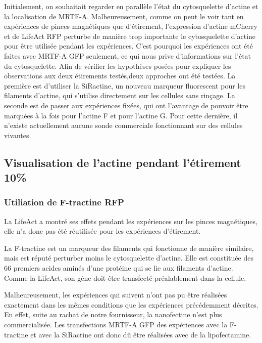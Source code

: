 Initialement, on souhaitait regarder en parallèle l'état du cytosquelette d'actine et la localisation de MRTF-A. 
Malheureusement, comme on peut le voir tant en expériences de pinces magnétiques que d'étirement, l'expression d'actine mCherry et de LifeAct RFP perturbe de manière trop importante le cytosquelette d'actine pour être utilisée pendant les expériences. 
C'est pourquoi les expériences ont été faites avec MRTF-A GFP seulement, ce qui nous prive d'informations sur l'état du cytosquelette.
Afin de vérifier les hypothèses posées pour expliquer les observations aux deux étirements testés,deux approches ont été testées. La première est d'utiliser la SiRactine, un nouveau marqueur fluorescent pour les filaments d'actine, qui s'utilise directement sur les cellules sans rinçage. 
La seconde est de passer aux expériences fixées, qui ont l'avantage de pouvoir être marquées à la fois pour l'actine F et pour l'actine G. Pour cette dernière, il n'existe actuellement aucune sonde commerciale fonctionnant sur des cellules vivantes. 

\subsection{Visualisation de l'actine pendant l'étirement 10\%}

\subsubsection{Utiliation de F-tractine RFP}


La LifeAct a montré ses effets pendant les expériences sur les pinces magnétiques, elle n'a donc pas été réutilisée pour les expériences d'étirement. 

La F-tractine est un marqueur des filaments qui fonctionne de manière similaire, mais est réputé perturber moins le cytosquelette d'actine. Elle est constituée des 66 premiers acides aminés d'une protéine qui se lie aux filaments d'actine. Comme la LifeAct, son gène doit être transfecté préalablement dans la cellule. 

Malheureusement, les expériences qui suivent n'ont pas pu être réalisées exactement dans les mêmes conditions que les expériences précédemment décrites. En effet, suite au rachat de notre fournisseur, la nanofectine n'est plus commercialisée. Les transfections MRTF-A GFP des expériences avec la F-tractine et avec la SiRactine ont donc dû être réalisées avec de la lipofectamine. 

